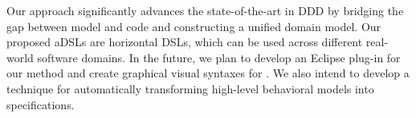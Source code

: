 Our approach signiﬁcantly advances the state-of-the-art in DDD by bridging the gap between model and code and constructing a uniﬁed domain model. Our proposed aDSLs are horizontal DSLs, which can be used across diﬀerent real-world software domains. In the future, we plan to develop an Eclipse plug-in for our method and create graphical visual syntaxes for \agldcsl. We also intend to develop a technique for automatically transforming high-level behavioral models into \agldcsl speciﬁcations.